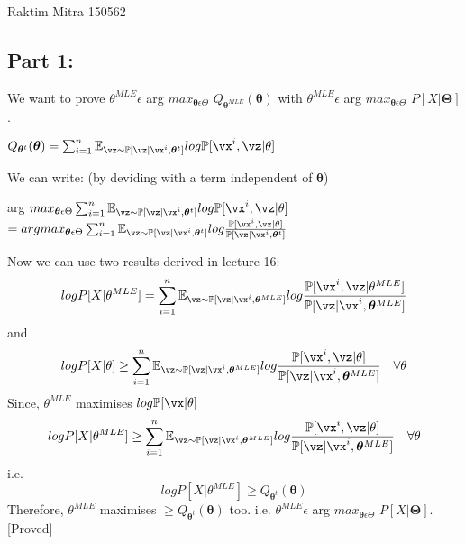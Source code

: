 \documentclass[a4paper,11pt]{article}
\begin{document}
								{Raktim Mitra}      						           		%
								{150562}																		%

\begin{mlsolution}

\subsection*{Part 1:} We want to prove $\theta^{MLE}\epsilon$ arg $max_{\bm{\theta} \epsilon \Theta}$ $Q_{\bm{\theta}^{MLE}}(\bm{\theta}) $ with $\theta^{MLE} \epsilon$ arg $max_{\bm{\theta} \epsilon \Theta}$ $P[X | \bm{\Theta}] $.

\begin{center}
$Q_{\bm{\theta}^t}(\bm{\theta}) = \sum_{i=1}^{n}\mathbb{E}_{\vz\sim\mathbb{P}[\vz | \vx^i,\bm{\theta}^t]}log\mathbb{P}[\vx^i,\vz | \theta]$
\end{center} 
We can write: (by deviding with a term independent of $\bm{\theta}$)
\begin{center}
arg $max_{\bm{\theta} \epsilon \Theta}\sum_{i=1}^{n}\mathbb{E}_{\vz\sim\mathbb{P}[\vz | \vx^i,\bm{\theta}^t]}log\mathbb{P}[\vx^i,\vz | \theta] $\\[0.5em]
$= arg max_{\bm{\theta} \epsilon \Theta}\sum_{i=1}^{n}\mathbb{E}_{\vz\sim\mathbb{P}[\vz | \vx^i,\bm{\theta}^t]}log\frac{\mathbb{P}[\vx^i,\vz | \theta]}{\mathbb{P}[\vz | \vx^i,\bm{\theta}^t]}$
\end{center}
Now we can use two results derived in lecture 16: $$log P[X |\theta^{MLE}] = \sum_{i=1}^{n}\mathbb{E}_{\vz\sim\mathbb{P}[\vz | \vx^i,\bm{\theta}^{MLE}]}log\frac{\mathbb{P}[\vx^i,\vz | \theta^{MLE}]}{\mathbb{P}[\vz | \vx^i,\bm{\theta}^{MLE}]}$$ and $$log P[X |\theta] \geq \sum_{i=1}^{n}\mathbb{E}_{\vz\sim\mathbb{P}[\vz | \vx^i,\bm{\theta}^{MLE}]}log\frac{\mathbb{P}[\vx^i,\vz | \theta]}{\mathbb{P}[\vz | \vx^i,\bm{\theta}^{MLE}]}\quad \forall \theta$$ 
Since, $\theta^{MLE}$ maximises $log \mathbb{P}[\vx | \theta]$
$$log P[X |\theta^{MLE}] \geq \sum_{i=1}^{n}\mathbb{E}_{\vz\sim\mathbb{P}[\vz | \vx^i,\bm{\theta}^{MLE}]}log\frac{\mathbb{P}[\vx^i,\vz | \theta]}{\mathbb{P}[\vz | \vx^i,\bm{\theta}^{MLE}]}\quad \forall \theta$$ i.e.
$$log P[X |\theta^{MLE}] \geq Q_{\bm{\theta}^t}(\bm{\theta})$$ Therefore, $\theta^{MLE}$ maximises $\geq Q_{\bm{\theta}^t}(\bm{\theta})$ too. i.e.  $\theta^{MLE} \epsilon$ arg $max_{\bm{\theta} \epsilon \Theta}$ $P[X | \bm{\Theta}] $. [Proved]

\end{mlsolution}
\end{document}
